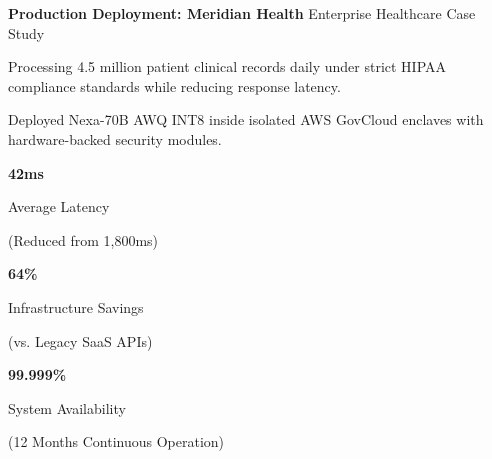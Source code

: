 \documentclass[20pt,landscape,a4paper]{foils}
\newcommand{\SlideHeader}[2]{%
  \begin{tcolorbox}[headerbox]
    {\Huge\bfseries #1} \hfill {\large\textcolor{SlateBorder}{#2}}
  \end{tcolorbox}
  \vspace{6pt}
}
\begin{document}
\SlideHeader{Production Deployment: Meridian Health}{Enterprise Healthcare Case Study}

\begin{tcolorbox}[basebox]
  \begin{description}[leftmargin=8pt]
    \item[\textcolor{NavyPrimary}{\textbf{Enterprise Challenge:}}] Processing 4.5 million patient clinical records daily under strict HIPAA compliance standards while reducing response latency.
    \item[\textcolor{TealAccent}{\textbf{Architectural Solution:}}] Deployed Nexa-70B AWQ INT8 inside isolated AWS GovCloud enclaves with hardware-backed security modules.
  \end{description}
\end{tcolorbox}

\vspace{6pt}
\noindent
\begin{minipage}[t]{0.31\textwidth}
  \begin{tcolorbox}[amberbox]
    \centering
    {\Huge\bfseries\textcolor{AmberAccent}{42ms}} \par\vspace{2pt}
    {\small Average Latency} \par
    \tiny (Reduced from 1,800ms)
  \end{tcolorbox}
\end{minipage}%
\hfill
\begin{minipage}[t]{0.31\textwidth}
  \begin{tcolorbox}[accentbox]
    \centering
    {\Huge\bfseries\textcolor{TealAccent}{64\%}} \par\vspace{2pt}
    {\small Infrastructure Savings} \par
    \tiny (vs. Legacy SaaS APIs)
  \end{tcolorbox}
\end{minipage}%
\hfill
\begin{minipage}[t]{0.31\textwidth}
  \begin{tcolorbox}[basebox]
    \centering
    {\Huge\bfseries\textcolor{NavyPrimary}{99.999\%}} \par\vspace{2pt}
    {\small System Availability} \par
    \tiny (12 Months Continuous Operation)
  \end{tcolorbox}
\end{minipage}
\pagebreak
\end{document}
